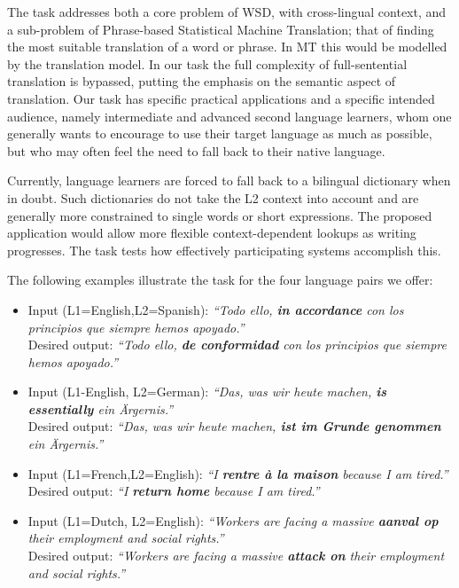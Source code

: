 The task addresses both a core problem of WSD, with cross-lingual context, and
a sub-problem of Phrase-based Statistical Machine Translation; that of finding
the most suitable translation of a word or phrase.  In MT this would be
modelled by the translation model. In our task the full complexity of
full-sentential translation is bypassed, putting the emphasis on the semantic
aspect of translation. Our task has specific practical applications and a
specific intended audience, namely intermediate and advanced second language
learners, whom one generally wants to encourage to use their target language as
much as possible, but who may often feel the need to fall back to their native
language.

Currently, language learners are forced to fall back to a bilingual dictionary
when in doubt. Such dictionaries do not take the L2 context into account and
are generally more constrained to single words or short expressions. The
proposed application would allow more flexible context-dependent lookups as
writing progresses. The task tests how effectively participating systems
accomplish this.

The following examples illustrate the task for the four language pairs we
offer: 


\begin{itemize}
  \item 
    Input (L1=English,L2=Spanish): \emph{“Todo ello, \textbf{ in accordance}  con los principios que siempre hemos apoyado.”} \\
    Desired output: \emph{“Todo ello,  \textbf{de conformidad} con los principios que siempre hemos apoyado.”}
  \item
    Input (L1-English, L2=German): \emph{“Das, was wir heute machen, \textbf{is essentially} ein Ärgernis.”} \\
    Desired output: \emph{“Das, was wir heute machen, \textbf{ist im Grunde genommen} ein Ärgernis.”}
  \item
    Input (L1=French,L2=English): \emph{“I \textbf{rentre à la maison} because
    I am tired.”} \\
    Desired output: \emph{“I \textbf{return home} because I am tired.”}
  \item
    Input (L1=Dutch, L2=English): \emph{“Workers are facing a massive \textbf{aanval
    op} their employment and social rights.”} \\
    Desired output: \emph{“Workers are facing a massive \textbf{attack on}
    their employment and social rights.”}
\end{itemize}


